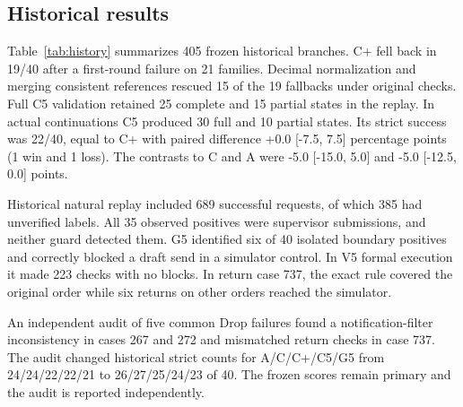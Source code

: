 \subsection{Historical results}

Table~\ref{tab:history} summarizes 405 frozen historical branches. C+ fell back in 19/40 after a first-round failure on 21 families. Decimal normalization and merging consistent references rescued 15 of the 19 fallbacks under original checks. Full C5 validation retained 25 complete and 15 partial states in the replay. In actual continuations C5 produced 30 full and 10 partial states. Its strict success was 22/40, equal to C+ with paired difference +0.0 [-7.5, 7.5] percentage points (1 win and 1 loss). The contrasts to C and A were -5.0 [-15.0, 5.0] and -5.0 [-12.5, 0.0] points.

Historical natural replay included 689 successful requests, of which 385 had unverified labels. All 35 observed positives were supervisor submissions, and neither guard detected them. G5 identified six of 40 isolated boundary positives and correctly blocked a draft send in a simulator control. In V5 formal execution it made 223 checks with no blocks. In return case 737, the exact rule covered the original order while six returns on other orders reached the simulator.

An independent audit of five common Drop failures found a notification-filter inconsistency in cases 267 and 272 and mismatched return checks in case 737. The audit changed historical strict counts for A/C/C+/C5/G5 from 24/24/22/22/21 to 26/27/25/24/23 of 40. The frozen scores remain primary and the audit is reported independently.
